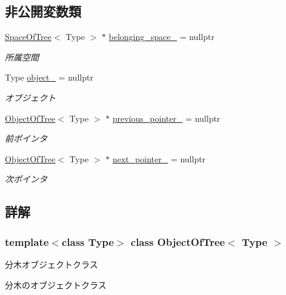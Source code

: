 \subsection*{非公開変数類}
\begin{DoxyCompactItemize}
\item 
\mbox{\hyperlink{class_space_of_tree}{Space\+Of\+Tree}}$<$ Type $>$ $\ast$ \mbox{\hyperlink{class_object_of_tree_a4f0673854adc10539b4b99558ea3b696}{belonging\+\_\+space\+\_\+}} = nullptr
\begin{DoxyCompactList}\small\item\em 所属空間 \end{DoxyCompactList}\item 
Type \mbox{\hyperlink{class_object_of_tree_ad3ce36879f78ba2c2171385a8428c7ba}{object\+\_\+}} = nullptr
\begin{DoxyCompactList}\small\item\em オブジェクト \end{DoxyCompactList}\item 
\mbox{\hyperlink{class_object_of_tree}{Object\+Of\+Tree}}$<$ Type $>$ $\ast$ \mbox{\hyperlink{class_object_of_tree_a77243aefc3b9766b6dcf28ec713eef8e}{previous\+\_\+pointer\+\_\+}} = nullptr
\begin{DoxyCompactList}\small\item\em 前ポインタ \end{DoxyCompactList}\item 
\mbox{\hyperlink{class_object_of_tree}{Object\+Of\+Tree}}$<$ Type $>$ $\ast$ \mbox{\hyperlink{class_object_of_tree_a3b8a98c6ba800927492a67ee6dd1d6de}{next\+\_\+pointer\+\_\+}} = nullptr
\begin{DoxyCompactList}\small\item\em 次ポインタ \end{DoxyCompactList}\end{DoxyCompactItemize}


\subsection{詳解}
\subsubsection*{template$<$class Type$>$\newline
class Object\+Of\+Tree$<$ Type $>$}

分木オブジェクトクラス 

分木のオブジェクトクラス 

